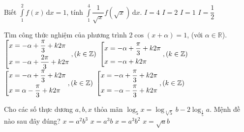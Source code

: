 \begin{ex}%
Biết $\displaystyle\int\limits_1^2 f(x)\mathrm{\, d}x=1$, tính $\displaystyle\int\limits_1^4 \dfrac{1}{\sqrt{x}} f\left(\sqrt{x}\right)\mathrm{\, d}x$.
\choice
{$I=4$}
{\True $I=2$}
{$I=1$}
{$I=\dfrac{1}{2}$}
\end{ex}
\begin{ex}%
Tìm công thức nghiệm của phương trình $2\cos\left(x+\alpha\right)=1$, (với $\alpha\in\mathbb{R}$).
\choice
{$\left[\begin{aligned}&x=-\alpha +\dfrac{\pi}{3}+k2\pi\\&x=-\alpha +\dfrac{2\pi}{3}+k2\pi\end{aligned}\right., \left(k\in\mathbb{Z}\right)$}
{$\left[\begin{aligned}&x=-\alpha +\dfrac{\pi}{3}+k2\pi\\&x=-\alpha +k2\pi\end{aligned}\right., \left(k\in\mathbb{Z}\right)$}
{$\left[\begin{aligned}&x=-\alpha +\dfrac{\pi}{3}+k2\pi\\&x=\alpha -\dfrac{\pi}{3}+k2\pi\end{aligned}\right., \left(k\in\mathbb{Z}\right)$}
{\True $\left[\begin{aligned}&x=-\alpha +\dfrac{\pi}{3}+k2\pi\\&x=-\alpha -\dfrac{\pi}{3}+k2\pi\end{aligned}\right., \left(k\in\mathbb{Z}\right)$}
\end{ex}
\begin{ex}%
Cho các số thực dương $a,b,x$ thỏa mãn $\log_5x=\log_{\sqrt[3]{5}}b-2\log_{\frac{1}{5}}a$. Mệnh đề nào sau đây đúng?
\choice
{\True $x=a^2b^3$}
{$x=a^3b$}
{$x=a^3b^2$}
{$x=\sqrt{a}b$}
\end{ex}
